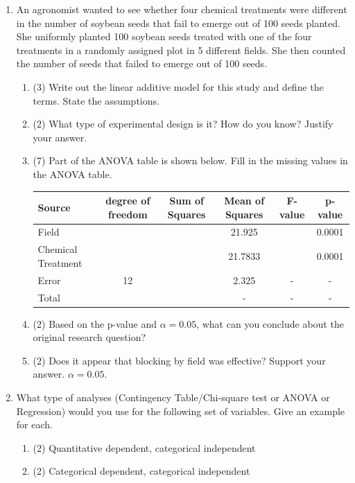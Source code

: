 \documentclass[11pt]{article}
\begin{document}
\begin{enumerate}
\begin{enumerate}
\end{enumerate}
\item	An agronomist wanted to see whether four chemical treatments were different in the number of soybean seeds that fail to emerge out of 100 seeds planted.  She uniformly planted 100 soybean seeds treated with one of the four treatments in a randomly assigned plot in 5 different fields. She then counted the number of seeds that failed to emerge out of 100 seeds.
\begin{enumerate}
\item (3) Write out the linear additive model for this study and define the terms. State the assumptions.\\[2in]
\item (2) What type of experimental design is it? How do you know? Justify your answer.\\[1.5in]
\item (7) Part of the ANOVA table is shown below. Fill in the missing values in the ANOVA table.
\begin{center}
\begin{tabular}{|l|c|c|c|c|c|} \hline
Source & degree of freedom & Sum of Squares & Mean of Squares & F-value & p-value \\ \hline
Field & &&21.925&&0.0001\\ \hline
Chemical Treatment &&&21.7833&&0.0001\\ \hline
Error &12&&2.325&-&-\\ \hline
Total &&&-&-&-\\ \hline
\end{tabular}
\end{center}
\item (2) Based on the p-value and $\alpha=0.05$, what can you conclude about the original research question?\\[1in]
\item (2) Does it appear that blocking by field was effective? Support your answer. $\alpha=0.05$. \\[1in]
\end{enumerate}
\item What type of analyses (Contingency Table/Chi-square test or ANOVA or Regression) would you use for the following set of variables. Give an example for each.
\begin{enumerate}
\item (2) Quantitative dependent, categorical independent\\[1.5in]
\item (2) Categorical dependent, categorical independent \\[1.5in]

\end{enumerate}
\end{enumerate}
\end{document}
